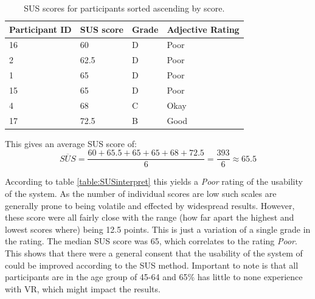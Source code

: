 \begin{table}[H]
\centering
\begin{tabular}{l|l|l|l}
{\textbf{Participant ID}} & { \textbf{SUS score}} & { \textbf{Grade}} & { \textbf{Adjective Rating}}\\ \hline
16   & 60   &  D & Poor                                   \\ 
2   & 62.5 &  D & Poor                                    \\ 
1   & 65 &  D & Poor                                   \\ 
15   & 65 &  D & Poor                                     \\ 
4   & 68 &  C & Okay                                    \\ 
17   & 72.5 &  B & Good                                     \\ 
\end{tabular}
\caption{SUS scores for participants sorted ascending by score.}
\label{table:phase3SUSscores}
\end{table}

This gives an average SUS score of: 
\[\overline{SUS} = \frac{60 + 65.5 + 65 + 65 + 68 + 72.5}{6} = \frac{393}{6} \approx 65.5\]

According to table \ref{table:SUSinterpret} this yields a \textit{Poor} rating of the usability of the system. As the number of individual scores are low such scales are generally prone to being volatile and effected by widespread results. However, these score were all fairly close with the range (how far apart the highest and lowest scores where) being 12.5 points. This is just a variation of a single grade in the rating. The median SUS score was 65, which correlates to the rating \textit{Poor}. This shows that there were a general consent that the usability of the system of could be improved according to the SUS method. Important to note is that all participants are in the age group of 45-64 and 65\% has little to none experience with VR, which might impact the results. 


\cleardoublepage